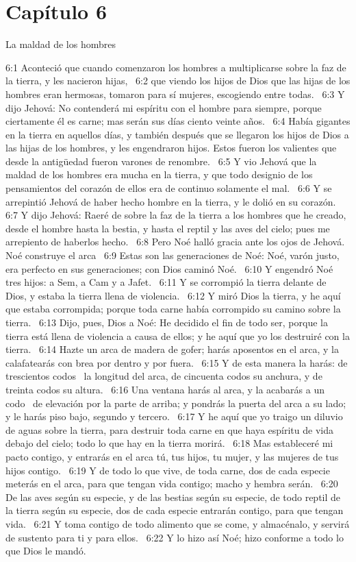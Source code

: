 \section*{Capítulo 6}
La maldad de los hombres  

6:1 Aconteció que cuando comenzaron los hombres a multiplicarse sobre la faz de la tierra, y les nacieron hijas,  
6:2 que viendo los hijos de Dios que las hijas de los hombres eran hermosas, tomaron para sí mujeres, escogiendo entre todas.  
6:3 Y dijo Jehová: No contenderá mi espíritu con el hombre para siempre, porque ciertamente él es carne; mas serán sus días ciento veinte años.  
6:4 Había gigantes en la tierra en aquellos días, y también después que se llegaron los hijos de Dios a las hijas de los hombres, y les engendraron hijos. Estos fueron los valientes que desde la antigüedad fueron varones de renombre.  
6:5 Y vio Jehová que la maldad de los hombres era mucha en la tierra, y que todo designio de los pensamientos del corazón de ellos era de continuo solamente el mal.  
6:6 Y se arrepintió Jehová de haber hecho hombre en la tierra, y le dolió en su corazón.  
6:7 Y dijo Jehová: Raeré de sobre la faz de la tierra a los hombres que he creado, desde el hombre hasta la bestia, y hasta el reptil y las aves del cielo; pues me arrepiento de haberlos hecho.  
6:8 Pero Noé halló gracia ante los ojos de Jehová.  
Noé construye el arca  
6:9 Estas son las generaciones de Noé: Noé, varón justo, era perfecto en sus generaciones; con Dios caminó Noé.  
6:10 Y engendró Noé tres hijos: a Sem, a Cam y a Jafet.  
6:11 Y se corrompió la tierra delante de Dios, y estaba la tierra llena de violencia.  
6:12 Y miró Dios la tierra, y he aquí que estaba corrompida; porque toda carne había corrompido su camino sobre la tierra.  
6:13 Dijo, pues, Dios a Noé: He decidido el fin de todo ser, porque la tierra está llena de violencia a causa de ellos; y he aquí que yo los destruiré con la tierra.  
6:14 Hazte un arca de madera de gofer; harás aposentos en el arca, y la calafatearás con brea por dentro y por fuera.  
6:15 Y de esta manera la harás: de trescientos codos  la longitud del arca, de cincuenta codos su anchura, y de treinta codos su altura.  
6:16 Una ventana harás al arca, y la acabarás a un codo  de elevación por la parte de arriba; y pondrás la puerta del arca a su lado; y le harás piso bajo, segundo y tercero.  
6:17 Y he aquí que yo traigo un diluvio de aguas sobre la tierra, para destruir toda carne en que haya espíritu de vida debajo del cielo; todo lo que hay en la tierra morirá.  
6:18 Mas estableceré mi pacto contigo, y entrarás en el arca tú, tus hijos, tu mujer, y las mujeres de tus hijos contigo.  
6:19 Y de todo lo que vive, de toda carne, dos de cada especie meterás en el arca, para que tengan vida contigo; macho y hembra serán.  
6:20 De las aves según su especie, y de las bestias según su especie, de todo reptil de la tierra según su especie, dos de cada especie entrarán contigo, para que tengan vida.  
6:21 Y toma contigo de todo alimento que se come, y almacénalo, y servirá de sustento para ti y para ellos.  
6:22 Y lo hizo así Noé; hizo conforme a todo lo que Dios le mandó.  
